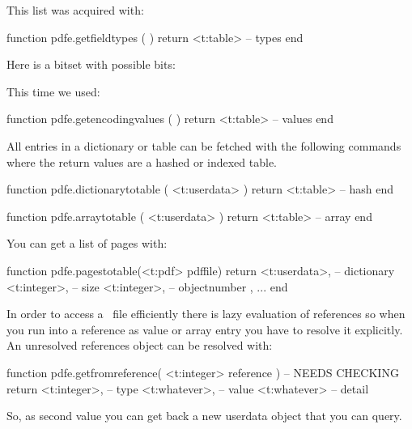 This list was acquired with:

\starttyping[option=LUA]
function pdfe.getfieldtypes ( )
    return <t:table> -- types
end
\stoptyping

Here  is a bitset with possible bits:

\startcolumns[n=4]
\stopcolumns

This time we used:

\starttyping[option=LUA]
function pdfe.getencodingvalues ( )
    return <t:table> -- values
end
\stoptyping

\stopsubsection

\startsubsection[title={Getting tables}]

All entries in a dictionary or table can be fetched with the following commands
where the return values are a hashed or indexed table.

\starttyping[option=LUA]
function pdfe.dictionarytotable ( <t:userdata> )
    return <t:table> -- hash
end

function pdfe.arraytotable ( <t:userdata> )
    return <t:table> -- array
end
\stoptyping

You can get a list of pages with:

\starttyping[option=LUA]
function pdfe.pagestotable(<t:pdf> pdffile)
    return {
        {
            <t:userdata>, -- dictionary
            <t:integer>,  -- size
            <t:integer>,  -- objectnumber
        },
        ...
    }
end
\stoptyping

\stopsubsection

\startsubsection[title={References}]

In order to access a \PDF\ file efficiently there is lazy evaluation of
references so when you run into a reference as value or array entry you have to
resolve it explicitly. An unresolved references object can be resolved with:

\starttyping
function pdfe.getfromreference( <t:integer> reference ) -- NEEDS CHECKING
    return
        <t:integer>,  -- type
        <t:whatever>, -- value
        <t:whatever>  -- detail
\stoptyping

So, as second value you can get back a new  userdata object that you
can query.

\stopsubsection

\stopsection

\stopdocument

